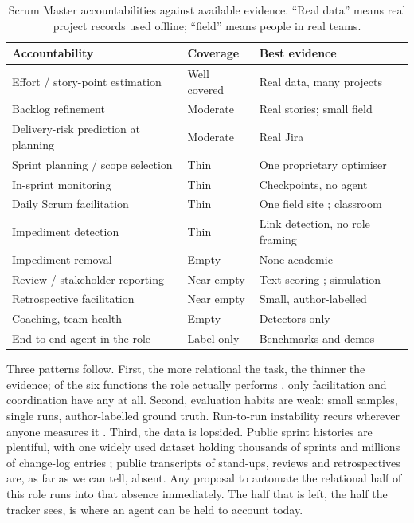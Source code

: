 \documentclass[conference]{IEEEtran}
\begin{document}
\begin{table}[!t]
\centering\scriptsize
\caption{Scrum Master accountabilities against available evidence. ``Real data'' means real project records used offline; ``field'' means people in real teams.}
\label{tab:gap}
\setlength{\tabcolsep}{3pt}
\begin{tabular}{llp{2.1cm}}
\hline
Accountability & Coverage & Best evidence\\
\hline
Effort / story-point estimation & Well covered & Real data, many projects \cite{tse2018,sprint2vec,tawosi23}\\
Backlog refinement & Moderate & Real stories; small field \cite{cabrero}\\
Delivery-risk prediction at planning & Moderate & Real Jira \cite{tse2018,sprint2vec,helwerda}\\
Sprint planning / scope selection & Thin & One proprietary optimiser \cite{kula24}\\
In-sprint monitoring & Thin & Checkpoints, no agent \cite{tse2018,kula23}\\
Daily Scrum facilitation & Thin & One field site \cite{cabrero}; classroom \cite{couder}\\
Impediment detection & Thin & Link detection, no role framing \cite{re2022}\\
Impediment removal & Empty & None academic\\
Review / stakeholder reporting & Near empty & Text scoring \cite{alliata}; simulation \cite{agentcompany}\\
Retrospective facilitation & Near empty & Small, author-labelled \cite{enase}\\
Coaching, team health & Empty & Detectors only \cite{toxicr}\\
End-to-end agent in the role & Label only & Benchmarks and demos \cite{agilecoder,almas}\\
\hline
\end{tabular}
\end{table}

Three patterns follow. First, the more relational the task, the thinner the evidence; of the six functions the role actually performs \cite{shastri}, only facilitation and coordination have any at all. Second, evaluation habits are weak: small samples, single runs, author-labelled ground truth. Run-to-run instability recurs wherever anyone measures it \cite{yoon}. Third, the data is lopsided. Public sprint histories are plentiful, with one widely used dataset holding thousands of sprints and millions of change-log entries \cite{tawos}; public transcripts of stand-ups, reviews and retrospectives are, as far as we can tell, absent. Any proposal to automate the relational half of this role runs into that absence immediately. The half that is left, the half the tracker sees, is where an agent can be held to account today.
\end{document}
